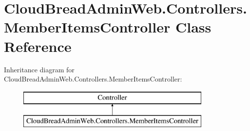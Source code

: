 \hypertarget{a00144}{}\section{Cloud\+Bread\+Admin\+Web.\+Controllers.\+Member\+Items\+Controller Class Reference}
\label{a00144}
Inheritance diagram for Cloud\+Bread\+Admin\+Web.\+Controllers.\+Member\+Items\+Controller\+:\begin{figure}[H]
\begin{center}
\leavevmode
\includegraphics[height=2.000000cm]{a00144}
\end{center}
\end{figure}
